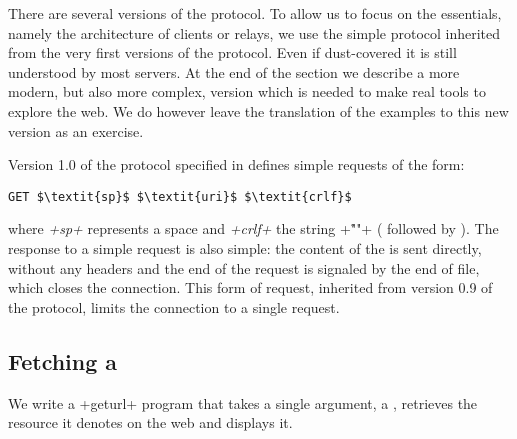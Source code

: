 There are several versions of the {\http} protocol. To allow us to
focus on the essentials, namely the architecture of clients or relays,
we use the simple protocol inherited from the very first versions of
the protocol. Even if dust-covered it is still understood by most
servers. At the end of the section we describe a more modern, but also
more complex, version which is needed to make real tools to explore
the web. We do however leave the translation of the examples to this
new version as an exercise. 

Version 1.0 of the {\http} protocol specified in  defines
simple requests of the form:
\begin{lstlisting}
GET $\textit{sp}$ $\textit{uri}$ $\textit{crlf}$
\end{lstlisting}
where \textit{\ml+sp+} represents a space and \textit{\ml+crlf+} the
string \ml+"\r\n"+ ( followed by
). The response to a simple request is also
simple: the content of the {\URL} is sent directly, without any
headers and the end of the request is signaled by the end of file,
which closes the connection. This form of request, inherited from
version 0.9 of the protocol, limits the connection to a single 
request.

\subsection*{Fetching a {\normalfont\URL}}

We write a \ml+geturl+ program that takes a single argument, a {\URL},
retrieves the resource it denotes on the web and displays it. 

